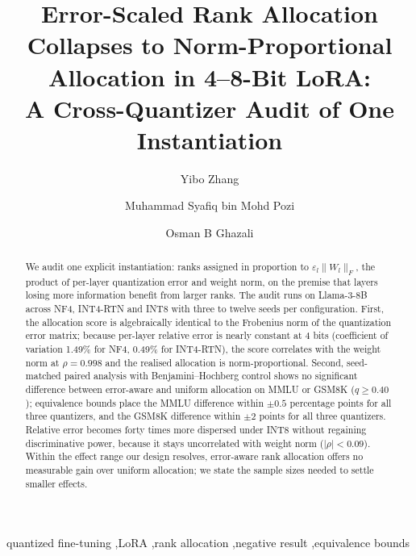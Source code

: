 \documentclass[preprint,12pt]{elsarticle}
\begin{document}
\begin{frontmatter}

\title{Error-Scaled Rank Allocation Collapses to Norm-Proportional Allocation in 4--8-Bit LoRA:\\
A Cross-Quantizer Audit of One Instantiation}

\author[inst1]{Yibo Zhang}
\author[inst1]{Muhammad Syafiq bin Mohd Pozi}
\author[inst1]{Osman B Ghazali}
\address[inst1]{School of Computing, Universiti Utara Malaysia,\\
06010 UUM Sintok, Kedah Darul Aman, Malaysia}

\begin{abstract}
We audit one explicit instantiation: ranks assigned in proportion to $\varepsilon_l\|W_l\|_F$, the product of per-layer quantization error and weight norm, on the premise that layers losing more information benefit from larger ranks. The audit runs on Llama-3-8B across NF4, INT4-RTN and INT8 with three to twelve seeds per configuration. First, the allocation score is algebraically identical to the Frobenius norm of the quantization error matrix; because per-layer relative error is nearly constant at 4 bits (coefficient of variation 1.49\% for NF4, 0.49\% for INT4-RTN), the score correlates with the weight norm at $\rho = 0.998$ and the realised allocation is norm-proportional. Second, seed-matched paired analysis with Benjamini--Hochberg control shows no significant difference between error-aware and uniform allocation on MMLU or GSM8K ($q \geq 0.40$); equivalence bounds place the MMLU difference within $\pm 0.5$ percentage points for all three quantizers, and the GSM8K difference within $\pm 2$ points for all three quantizers. Relative error becomes forty times more dispersed under INT8 without regaining discriminative power, because it stays uncorrelated with weight norm ($|\rho| < 0.09$). Within the effect range our design resolves, error-aware rank allocation offers no measurable gain over uniform allocation; we state the sample sizes needed to settle smaller effects.
\end{abstract}

\begin{keyword}
quantized fine-tuning \sep LoRA \sep rank allocation \sep negative result \sep equivalence bounds
\end{keyword}

\end{frontmatter}
\end{document}
